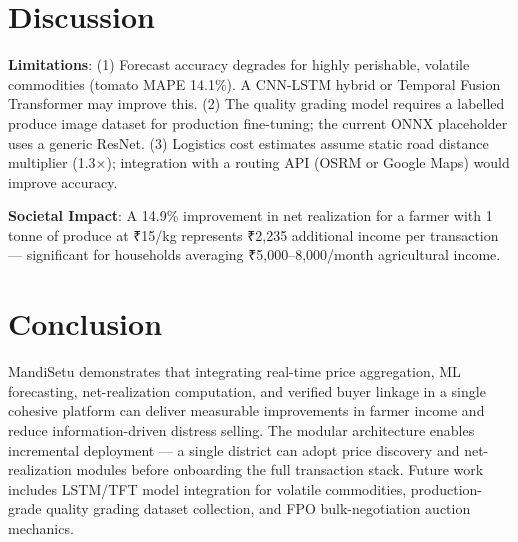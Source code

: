 \documentclass[conference]{IEEEtran}
\begin{document}
\section{Discussion}

\textbf{Limitations}: (1) Forecast accuracy degrades for highly perishable, volatile commodities (tomato MAPE 14.1\%). A CNN-LSTM hybrid or Temporal Fusion Transformer may improve this. (2) The quality grading model requires a labelled produce image dataset for production fine-tuning; the current ONNX placeholder uses a generic ResNet. (3) Logistics cost estimates assume static road distance multiplier (1.3×); integration with a routing API (OSRM or Google Maps) would improve accuracy.

\textbf{Societal Impact}: A 14.9\% improvement in net realization for a farmer with 1 tonne of produce at ₹15/kg represents ₹2,235 additional income per transaction — significant for households averaging ₹5,000–8,000/month agricultural income.

\section{Conclusion}
\label{sec:conclusion}

MandiSetu demonstrates that integrating real-time price aggregation, ML forecasting, net-realization computation, and verified buyer linkage in a single cohesive platform can deliver measurable improvements in farmer income and reduce information-driven distress selling. The modular architecture enables incremental deployment — a single district can adopt price discovery and net-realization modules before onboarding the full transaction stack. Future work includes LSTM/TFT model integration for volatile commodities, production-grade quality grading dataset collection, and FPO bulk-negotiation auction mechanics.
\end{document}
